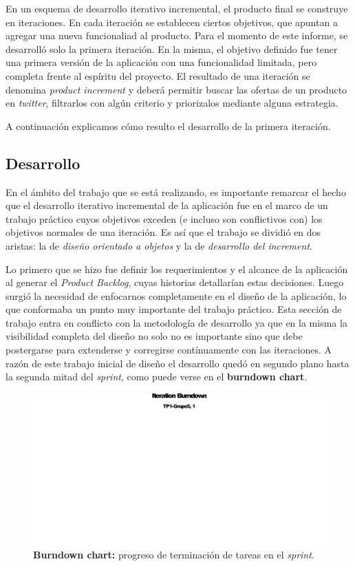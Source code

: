 \documentclass[10pt, a4paper]{article}
\begin{document}
En un esquema de desarrollo iterativo incremental, el producto final se construye en iteraciones. En cada iteración se establecen ciertos objetivos, que apuntan a agregar una nueva funcionaliad al producto. Para el momento de este informe, se desarrolló solo la primera iteración. En la misma, el objetivo definido fue tener una primera versión de la aplicación con una funcionalidad limitada, pero completa frente al espíritu del proyecto. El resultado de una iteración se denomina \emph{product increment} y deberá permitir buscar las ofertas de un producto en \emph{twitter}, filtrarlos con algún criterio y priorizalos mediante alguna estrategia.

A continuación explicamos cómo resulto el desarrollo de la primera iteración.

\subsection{Desarrollo}

En el ámbito del trabajo que se está realizando, es importante remarcar el hecho que el desarrollo iterativo incremental de la aplicación fue en el marco de un trabajo práctico cuyos objetivos exceden (e incluso son conflictivos con) los objetivos normales de una iteración. Es así que el trabajo se dividió en dos aristas: la de \emph{diseño orientado a objetos} y la de \emph{desarrollo del increment}. 

Lo primero que se hizo fue definir los requerimientos y el alcance de la aplicación al generar el \emph{Product Backlog}, cuyas historias detallarían estas decisiones. Luego surgió la necesidad de enfocarnos completamente en el diseño de la aplicación, lo que conformaba un punto muy importante del trabajo práctico. Esta sección de trabajo entra en conflicto con la metodología de desarrollo ya que en la misma la visibilidad completa del diseño no solo no es importante sino que debe postergarse para extenderse y corregirse contínuamente con las iteraciones. A razón de este trabajo inicial de diseño el desarrollo quedó en segundo plano hasta la segunda mitad del \emph{sprint}, como puede verse en el \textbf{burndown chart}.

\begin{figure}[H]
\centering
\includegraphics[width=\textwidth]{graphics/iteration_burndown.pdf}
\caption{\textbf{Burndown chart:} progreso de terminación de tareas en el \emph{sprint}.}
\end{figure}
\end{document}
